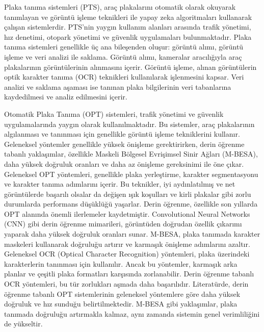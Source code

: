 \documentclass[]{article}
\begin{document}
	Plaka tanıma sistemleri (PTS), araç plakalarını otomatik olarak okuyarak tanımlayan ve görüntü işleme teknikleri ile yapay zeka algoritmaları kullanarak çalışan sistemlerdir. PTS'nin yaygın kullanım alanları arasında trafik yönetimi, hız denetimi, otopark yönetimi ve güvenlik uygulamaları bulunmaktadır\cite{makale}. Plaka tanıma sistemleri genellikle üç ana bileşenden oluşur: görüntü alımı, görüntü işleme ve veri analizi ile saklama. Görüntü alımı, kameralar aracılığıyla araç plakalarının görüntülerinin alınmasını içerir. Görüntü işleme, alınan görüntülerin optik karakter tanıma (OCR) teknikleri kullanılarak işlenmesini kapsar. Veri analizi ve saklama aşaması ise tanınan plaka bilgilerinin veri tabanlarına kaydedilmesi ve analiz edilmesini içerir\cite{yavuz}.
	
	Otomatik Plaka Tanıma (OPT) sistemleri, trafik yönetimi ve güvenlik uygulamalarında yaygın olarak kullanılmaktadır. Bu sistemler, araç plakalarının algılanması ve tanınması için genellikle görüntü işleme tekniklerini kullanır. Geleneksel yöntemler genellikle yüksek önişleme gerektirirken, derin öğrenme tabanlı yaklaşımlar, özellikle Maskeli Bölgesel Evrişimsel Sinir Ağları (M-BESA), daha yüksek doğruluk oranları ve daha az önişleme gereksinimi ile öne çıkar. Geleneksel OPT yöntemleri, genellikle plaka yerleştirme, karakter segmentasyonu ve karakter tanıma adımlarını içerir. Bu teknikler, iyi aydınlatılmış ve net görüntülerde başarılı olsalar da değişen ışık koşulları ve kirli plakalar gibi zorlu durumlarda performans düşüklüğü yaşarlar. Derin öğrenme, özellikle son yıllarda OPT alanında önemli ilerlemeler kaydetmiştir. Convolutional Neural Networks (CNN) gibi derin öğrenme mimarileri, görüntüden doğrudan özellik çıkarımı yaparak daha yüksek doğruluk oranları sunar. M-BESA, plaka tanımada karakter maskeleri kullanarak doğruluğu artırır ve karmaşık önişleme adımlarını azaltır. Geleneksel OCR (Optical Character Recognition) yöntemleri, plaka üzerindeki karakterlerin tanınması için kullanılır. Ancak bu yöntemler, karmaşık arka planlar ve çeşitli plaka formatları karşısında zorlanabilir. Derin öğrenme tabanlı OCR yöntemleri, bu tür zorlukları aşmada daha başarılıdır. Literatürde, derin öğrenme tabanlı OPT sistemlerinin geleneksel yöntemlere göre daha yüksek doğruluk ve hız sunduğu belirtilmektedir. M-BESA gibi yaklaşımlar, plaka tanımada doğruluğu artırmakla kalmaz, aynı zamanda sistemin genel verimliliğini de yükseltir\cite{article_515830}.
	
\end{document}
